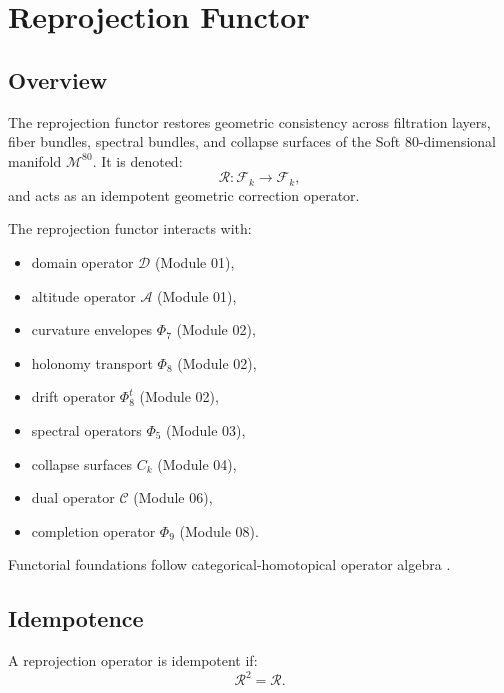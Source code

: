 
\section{Reprojection Functor}
\label{sec:ReprojectionFunctor}

\subsection{Overview}
The reprojection functor restores geometric consistency across filtration
layers, fiber bundles, spectral bundles, and collapse surfaces of the Soft
80-dimensional manifold $\mathcal{M}^{80}$. It is denoted:
\[
\mathcal{R} : \mathcal{F}_k \to \mathcal{F}_k,
\]
and acts as an idempotent geometric correction operator.

The reprojection functor interacts with:
\begin{itemize}
    \item domain operator $\mathcal{D}$ (Module 01),
    \item altitude operator $\mathcal{A}$ (Module 01),
    \item curvature envelopes $\Phi_7$ (Module 02),
    \item holonomy transport $\Phi_8$ (Module 02),
    \item drift operator $\Phi_8^t$ (Module 02),
    \item spectral operators $\Phi_5$ (Module 03),
    \item collapse surfaces $C_k$ (Module 04),
    \item dual operator $\mathcal{C}$ (Module 06),
    \item completion operator $\Phi_9$ (Module 08).
\end{itemize}

Functorial foundations follow categorical-homotopical operator algebra
.

\subsection{Idempotence}
\begin{definition}
A reprojection operator is idempotent if:
\[
\mathcal{R}^2 = \mathcal{R}.
\]
\end{definition}

